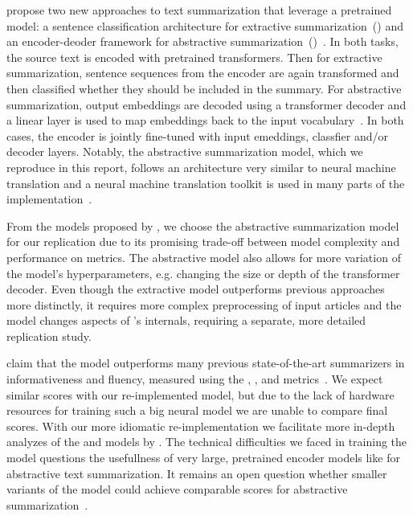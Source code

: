 \citeauthor{LiuL2019} propose two new approaches to text summarization that leverage a pretrained \Bert model: a sentence classification architecture for extractive summarization~(\BertSumExt) and an encoder-deoder framework for abstractive summarization~(\BertSumAbs)~\cite{LiuL2019}.
In both tasks, the source text is encoded with pretrained \Bert transformers. Then for extractive summarization, sentence sequences from the \Bert encoder are again transformed and then classified whether they should be included in the summary.
For abstractive summarization, \Bert output embeddings are decoded using a transformer decoder and a linear layer is used to map embeddings back to the input vocabulary~\cite{LiuL2019}. In both cases, the \Bert encoder is jointly fine-tuned with input emeddings, classfier and/or decoder layers.
Notably, the abstractive summarization model, which we reproduce in this report,
follows an architecture very similar to neural machine translation and a neural machine translation toolkit is used in many parts of the \BertSumAbs implementation~\cite{KleinKDSR2017}.

From the models proposed by \citeauthor{LiuL2019}, we choose the \BertSumAbs abstractive summarization model for our replication due to its promising trade-off between model complexity and performance on \Rouge metrics. The abstractive model also allows for more variation of the model's hyperparameters, e.g. changing the size or depth of the transformer decoder. 
Even though the extractive model \BertSumExt outperforms previous approaches more  distinctly, it requires more complex preprocessing of input articles and the model changes aspects of \Bert's internals, requiring a separate, more detailed replication study.

\citeauthor{LiuL2019} claim that the \BertSumAbs model outperforms many previous state-of-the-art summarizers in informativeness and fluency, measured using the , , and \RougeL metrics~\cite{LiuL2019,Lin2004}.
We expect similar scores with our re-implemented model, but due to the lack of hardware resources for training such a big neural model we are unable to compare final \Rouge scores.
With our more idiomatic re-implementation we facilitate more in-depth analyzes of the \BertSumAbs and \TransformerAbs models by \citeauthor{LiuL2019}.
The technical difficulties we faced in training the \BertSumAbs model questions the usefullness of very large, pretrained encoder models like \Bert for abstractive text summarization. It remains an open question whether smaller variants of the \Bert model could achieve comparable \Rouge scores for abstractive summarization~\cite{TurcCLT2019}.
